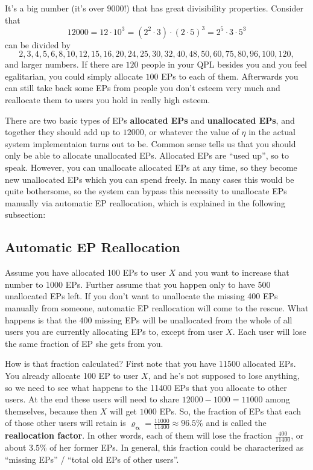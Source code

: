 \documentclass[a4paper,12pt]{scrartcl}
\newcounter{rationale}
\newcounter{comment}
\begin{document}
\begin{mdframed}[style=rationale, comment=Why $12000$?]
It's a big number (it's over $9000$!) that has great divisibility properties. Consider that
 $$12000=12\cdot 10^3=(2^2 \cdot 3) \cdot(2\cdot 5)^3=2^5 \cdot 3 \cdot 5^3$$
 can be divided by
 $$2,3,4,5,6,8,10,12,15,16,20,24,25,30,32,40,48,50,60,75,80,96,100,120,$$
 and larger numbers. If there are $120$ people in your QPL besides you and you feel egalitarian, you could simply allocate $100$ EPs to each of them. Afterwards you can still take back some EPs from people you don't esteem very much and reallocate them to users you hold in really high esteem.   
\end{mdframed}

There are two basic types of EPs \textbf{allocated EPs} and \textbf{unallocated EPs}, and together they should add up to $12000$, or whatever the value of $\eta$ in the actual system implementaion turns out to be. Common sense tells us that you should only be able to allocate unallocated EPs. Allocated EPs are ``used up'', so to speak. However, you can unallocate allocated EPs at any time, so they become new unallocated EPs which you can spend freely. In many cases this would be quite bothersome, so the system can bypass this necessity to unallocate EPs manually via automatic EP reallocation, which is explained in the following subsection:

\subsection{Automatic EP Reallocation}
Assume you have allocated 100 EPs to user $X$ and you want to increase that number to 1000 EPs. Further assume that you happen only to have 500 unallocated EPs left. If you don't want to unallocate the missing 400 EPs manually from someone, automatic EP reallocation will come to the rescue. What happens is that the 400 missing EPs will be unallocated from the whole of all users you are currently allocating EPs to, except from user $X$. Each user will lose the same fraction of EP she gets from you.

  How is that fraction calculated? First note that you have 11500 allocated EPs. You already allocate 100 EP to user $X$, and he's not supposed to lose anything, so we need to see what happens to the 11400 EPs that you allocate to other users. At the end these users will need to share $12000 - 1000 = 11000$ among themselves, because then $X$ will get $1000$ EPs. So, the fraction of EPs that each of those other users will retain is $\mathbf{\varrho_{\alpha}} = \frac{11000}{11400} \approx 96.5\%$ and is called the \textbf{reallocation factor}. In other words, each of them will lose the fraction $\frac{400}{11400}$, or about $3.5\%$ of her former EPs. In general, this fraction could be characterized as ``missing EPs'' / ``total old EPs of other users''.
\end{document}
